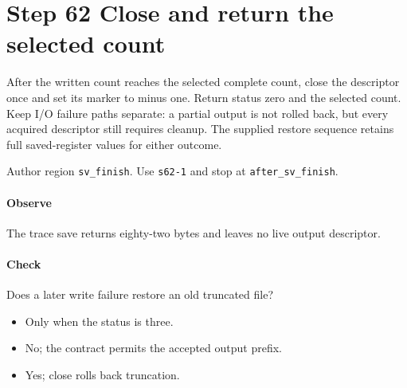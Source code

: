 \section{Step 62 Close and return the selected count}\label{pcm-wav-s62}
After the written count reaches the selected complete count, close the descriptor once and set its marker to minus one. Return status zero and the selected count. Keep I/O failure paths separate: a partial output is not rolled back, but every acquired descriptor still requires cleanup. The supplied restore sequence retains full saved-register values for either outcome.

Author region \texttt{sv\_finish}. Use \texttt{s62-1} and stop at \texttt{after\_sv\_finish}.

\paragraph{Observe} The trace save returns eighty-two bytes and leaves no live output descriptor.

\paragraph{Check} Does a later write failure restore an old truncated file?
\begin{itemize}
  \item[A.] Only when the status is three.
  \item[B.] No; the contract permits the accepted output prefix.
  \item[C.] Yes; close rolls back truncation.
\end{itemize}
